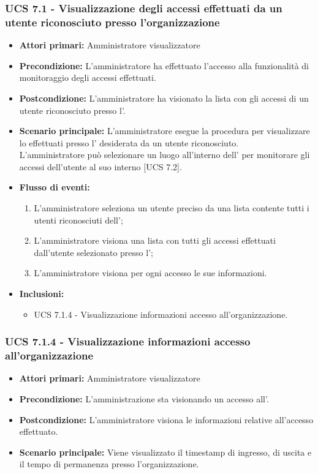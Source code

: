 \subsubsection{UCS 7.1 - Visualizzazione degli accessi effettuati da un utente riconosciuto presso l'organizzazione}
\begin{itemize}
	\item \textbf{Attori primari:} Amministratore visualizzatore
	\item \textbf{Precondizione:} L'amministratore ha effettuato l'accesso alla funzionalità di monitoraggio degli accessi effettuati.
	\item \textbf{Postcondizione:} L'amministratore ha visionato la lista con gli accessi di un utente riconosciuto presso l'.
	\item \textbf{Scenario principale:} L'amministratore esegue la procedura per visualizzare lo  effettuati presso l' desiderata da un utente riconosciuto.\\
	L'amministratore può selezionare un luogo all'interno dell' per monitorare gli accessi dell'utente al suo interno [UCS 7.2].
	\item \textbf{Flusso di eventi:}
	\begin{enumerate}
		\item L'amministratore seleziona un utente preciso da una lista contente tutti i utenti riconosciuti dell';
		\item L'amministratore visiona una lista con tutti gli accessi effettuati dall'utente selezionato presso l';
		\item L'amministratore visiona per ogni accesso le sue informazioni.
	\end{enumerate}
	\item \textbf{Inclusioni:}
    \begin{itemize}
        \item UCS 7.1.4 - Visualizzazione informazioni accesso all'organizzazione.
    \end{itemize}
\end{itemize}

\subsubsection{UCS 7.1.4 - Visualizzazione informazioni accesso all'organizzazione}
\begin{itemize}
	\item \textbf{Attori primari:} Amministratore visualizzatore
	\item \textbf{Precondizione:} L'amministrazione sta visionando un accesso all'.
	\item \textbf{Postcondizione:} L'amministratore visiona le informazioni relative all'accesso effettuato.
	\item \textbf{Scenario principale:} Viene visualizzato il timestamp di ingresso, di uscita e il tempo di permanenza presso l'organizzazione.
\end{itemize}

